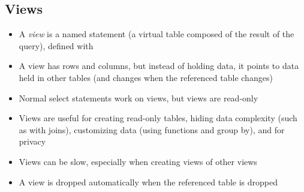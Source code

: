 \documentclass[a4paper]{article}
\begin{document}
\subsection{Views}
\begin{itemize}
    \item A \emph{view} is a named  statement (a virtual table composed of the result of the query), defined with 
    \item A view has rows and columns, but instead of holding data, it points to data held in other tables (and changes when the referenced table changes)
    \item Normal select statements work on views, but views are read-only
    \item Views are useful for creating read-only tables, hiding data complexity (such as with joins), customizing data (using functions and group by), and for privacy
    \item Views can be slow, especially when creating views of other views
    \item A view is dropped automatically when the referenced table is dropped
\end{itemize}
\end{document}
